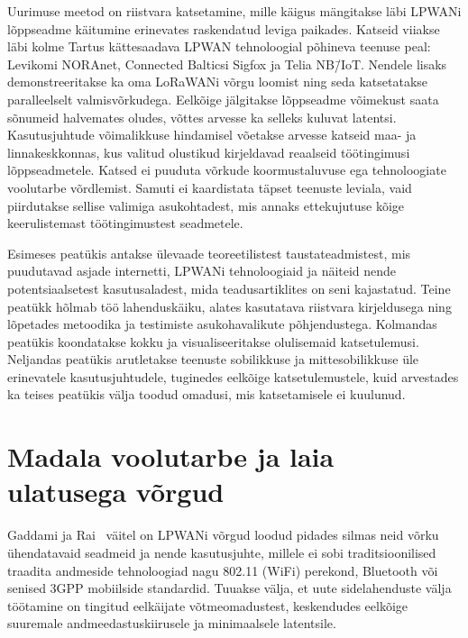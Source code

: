 \documentclass[12pt]{article}
\begin{document}
    Uurimuse meetod on riistvara katsetamine, mille käigus mängitakse läbi LPWANi lõppseadme käitumine erinevates raskendatud leviga paikades.
    Katseid viiakse läbi kolme Tartus kättesaadava LPWAN tehnoloogial põhineva teenuse peal: Levikomi NORAnet, Connected Balticsi Sigfox ja Telia NB\=/IoT.
    Nendele lisaks demonstreeritakse ka oma LoRaWANi võrgu loomist ning seda katsetatakse paralleelselt valmisvõrkudega.
    Eelkõige jälgitakse lõppseadme võimekust saata sõnumeid halvemates oludes, võttes arvesse ka selleks kuluvat latentsi.
    Kasutusjuhtude võimalikkuse hindamisel võetakse arvesse katseid maa- ja linnakeskkonnas, kus valitud olustikud kirjeldavad reaalseid töötingimusi lõppseadmetele.
    Katsed ei puuduta võrkude koormustaluvuse ega tehnoloogiate voolutarbe võrdlemist.
    Samuti ei kaardistata täpset teenuste leviala, vaid piirdutakse sellise valimiga asukohtadest, mis annaks ettekujutuse kõige keerulistemast töötingimustest seadmetele.

    Esimeses peatükis antakse ülevaade teoreetilistest taustateadmistest, mis puudutavad asjade internetti, LPWANi tehnoloogiaid ja näiteid nende potentsiaalsetest kasutusaladest, mida teadusartiklites on seni kajastatud.
    Teine peatükk hõlmab töö lahenduskäiku, alates kasutatava riistvara kirjeldusega ning lõpetades metoodika ja testimiste asukohavalikute põhjendustega.
    Kolmandas peatükis koondatakse kokku ja visualiseeritakse olulisemaid katsetulemusi.
    Neljandas peatükis arutletakse teenuste sobilikkuse ja mittesobilikkuse üle erinevatele kasutusjuhtudele, tuginedes eelkõige katsetulemustele, kuid arvestades ka teises peatükis välja toodud omadusi, mis katsetamisele ei kuulunud.

    \newpage

    \section{Madala voolutarbe ja laia ulatusega võrgud}

    Gaddami ja Rai~\cite{gaddam2018comparative} väitel on LPWANi võrgud loodud pidades silmas neid võrku ühendatavaid seadmeid ja nende kasutusjuhte, millele ei sobi traditsioonilised traadita andmeside tehnoloogiad nagu 802.11 (WiFi) perekond, Bluetooth või senised 3GPP mobiilside standardid.
    Tuuakse välja, et uute sidelahenduste välja töötamine on tingitud eelkäijate võtmeomadustest, keskendudes eelkõige suuremale andmeedastuskiirusele ja minimaalsele latentsile.
\end{document}
